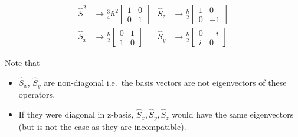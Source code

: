 \begin{align*}
    \widehat{S}^2   & \rightarrow \frac{3}{4}{\hbar}^2\begin{bmatrix}
                                                          1 & 0 \\
                                                          0 & 1
                                                      \end{bmatrix} &
    \widehat{S}_{z} & \rightarrow \frac{\hbar}{2}\begin{bmatrix}
                                                     1 & 0  \\
                                                     0 & -1
                                                 \end{bmatrix}       \\
    \widehat{S}_{x} & \rightarrow \frac{\hbar}{2}\begin{bmatrix}
                                                     0 & 1 \\
                                                     1 & 0
                                                 \end{bmatrix}      &
    \widehat{S}_{y} & \rightarrow \frac{\hbar}{2}\begin{bmatrix}
                                                     0 & -i \\
                                                     i & 0
                                                 \end{bmatrix}
\end{align*}

Note that
\begin{itemize}
    \item $\widehat{S}_{x}$, $\widehat{S}_{y}$ are non-diagonal i.e.\ the basis vectors are not eigenvectors of these operators.
    \item If they were diagonal in z-basis, $\widehat{S}_{x},\widehat{S}_{y},\widehat{S}_{z}$ would have the same eigenvectors (but is not the case as they are incompatible).
\end{itemize}



